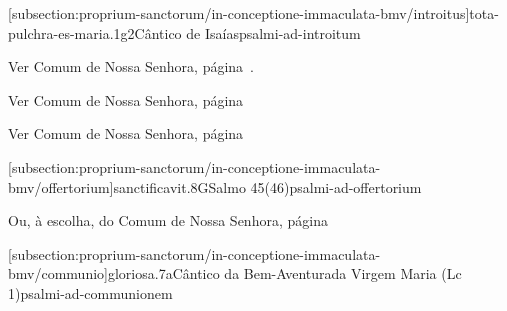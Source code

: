 \def\Prefix{subsection:proprium-sanctorum/in-conceptione-immaculata-bmv}

[\Prefix/introitus]{tota-pulchra-es-maria.1g2}{Cântico de Isaías}{psalmi-ad-introitum}

\AllowPageFlush

\begin{rubrica}
  Ver Comum de Nossa Senhora, página~\pageref{subsection:communia/commune-bmv/psalmus-responsorius}.
\end{rubrica}

\begin{rubrica}
  Ver Comum de Nossa Senhora, página~\pageref{subsection:communia/commune-bmv/alleluia}
\end{rubrica}

\begin{rubrica}
  Ver Comum de Nossa Senhora, página~\pageref{subsection:communia/commune-bmv/psalmus-alleluiaticus}
\end{rubrica}

\AllowPageFlush

[\Prefix/offertorium]{sanctificavit.8G}{Salmo 45(46)}{psalmi-ad-offertorium}

\begin{rubrica}
  Ou, à escolha, do Comum de Nossa Senhora, página~\pageref{subsection:communia/commune-bmv/offertorium}
\end{rubrica}

\AllowPageFlush

[\Prefix/communio]{gloriosa.7a}{Cântico da Bem-Aventurada Virgem Maria (Lc 1)}{psalmi-ad-communionem}